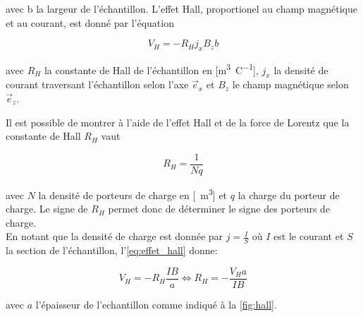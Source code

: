 \begin{minipage}{\textwidth}
    avec b la largeur de l'échantillon. L'effet Hall, proportionel au champ magnétique et au courant, est donné par l'équation

    \begin{equation}
        V_H = -R_H j_x B_z b
        \label{eq:effet_hall}
    \end{equation}

    avec \(R_H\) la constante de Hall de l'échantillon en [\si{\meter\cubed\per\coulomb}], \(j_x\) la densité de courant traversant l'échantillon selon l'axe \(\vec{e}_x\) et \(B_z\) le champ magnétique selon \(\vec{e}_z\). \cite{notice}
\end{minipage}

Il est possible de montrer à l'aide de l'effet Hall et de la force de Lorentz que la constante de Hall \(R_H\) vaut

\begin{equation}
    R_H = \frac{1}{Nq}
    \label{eq:N}
\end{equation}

avec \(N\) la densité de porteurs de charge en [\si{\per\meter\cubed}] et \(q\) la charge du porteur de charge. Le signe de \(R_H\) permet donc de déterminer le signe des porteurs de charge.\\
En notant que la densité de charge est donnée par \(j = \frac{I}{S}\) où \(I\) est le courant et \(S\) la section de l'échantillon, l'\autoref{eq:effet_hall} donne:

\begin{equation}
    V_H = -R_H \frac{IB}{a} \iff R_H = -\frac{V_H a}{IB}
    \label{eq:R_H}
\end{equation}

avec \(a\) l'épaisseur de l'echantillon comme indiqué à la \autoref{fig:hall}.
